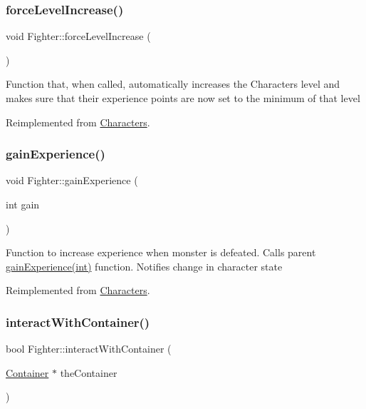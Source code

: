 \subsubsection{\texorpdfstring{force\+Level\+Increase()}{forceLevelIncrease()}}
{\footnotesize\ttfamily void Fighter\+::force\+Level\+Increase (\begin{DoxyParamCaption}{ }\end{DoxyParamCaption})\hspace{0.3cm}{\ttfamily [virtual]}}

Function that, when called, automatically increases the Character\textquotesingle{}s level and makes sure that their experience points are now set to the minimum of that level 

Reimplemented from \hyperlink{class_characters_ac5909582bf15fe17b7a6fa5104c26dd6}{Characters}.

\hypertarget{class_fighter_af411947929c37ef0a0eab87b0c45f4f3}{}\label{class_fighter_af411947929c37ef0a0eab87b0c45f4f3} 
\subsubsection{\texorpdfstring{gain\+Experience()}{gainExperience()}}
{\footnotesize\ttfamily void Fighter\+::gain\+Experience (\begin{DoxyParamCaption}\item[{int}]{gain }\end{DoxyParamCaption})\hspace{0.3cm}{\ttfamily [virtual]}}

Function to increase experience when monster is defeated. Calls parent \hyperlink{class_fighter_af411947929c37ef0a0eab87b0c45f4f3}{gain\+Experience(int)} function. Notifies change in character state 

Reimplemented from \hyperlink{class_characters_a77bd85803742621607c58d7c3593d7b0}{Characters}.

\hypertarget{class_fighter_a66c0adfa4979fa3ac994359a188121a8}{}\label{class_fighter_a66c0adfa4979fa3ac994359a188121a8} 
\subsubsection{\texorpdfstring{interact\+With\+Container()}{interactWithContainer()}}
{\footnotesize\ttfamily bool Fighter\+::interact\+With\+Container (\begin{DoxyParamCaption}\item[{\hyperlink{class_container}{Container} $\ast$}]{the\+Container }\end{DoxyParamCaption})}

